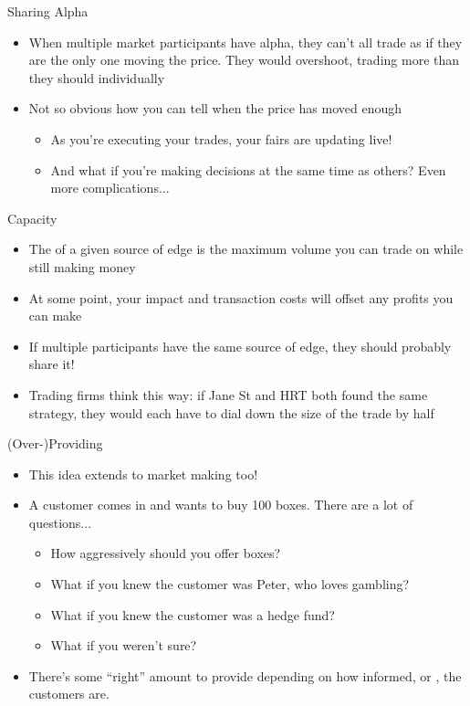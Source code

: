 Sharing Alpha
\begin{itemize}
    \item When multiple market participants have alpha, they can't all trade as if they are the only one moving the price. They would overshoot, trading more than they should individually
    \item Not so obvious how you can tell when the price has moved enough
        \begin{itemize}
            \item As you're executing your trades, your fairs are updating live!
            \item And what if you're making decisions at the same time as others? Even more complications...
        \end{itemize}
\end{itemize}

Capacity
\begin{itemize}
    \item The  of a given source of edge is the maximum volume you can trade on while still making money
    \item At some point, your impact and transaction costs will offset any profits you can make
    \item If multiple participants have the same source of edge, they should probably share it!
    \item Trading firms think this way: if Jane St and HRT both found the same strategy, they would each have to dial down the size of the trade by half
\end{itemize}

(Over-)Providing
\begin{itemize}
    \item This idea extends to market making too!
    \item A customer comes in and wants to buy 100 boxes. There are a lot of questions...
        \begin{itemize}
            \item How aggressively should you offer boxes?
            \item What if you knew the customer was Peter, who loves gambling?
            \item What if you knew the customer was a hedge fund?
            \item What if you weren't sure?
        \end{itemize}
    \item There's some ``right'' amount to provide depending on how informed, or , the customers are.
\end{itemize}

